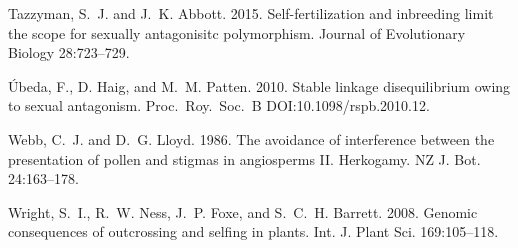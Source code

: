 \documentclass{article}
\begin{document}
\begin{thebibliography}{}
Tazzyman, S.~J. and J.~K. Abbott. 2015.
\newblock Self-fertilization and inbreeding limit the scope for sexually antagonisitc polymorphism.
\newblock Journal of Evolutionary Biology 28:723--729.

\'Ubeda, F., D. Haig, and M.~M. Patten. 2010.
\newblock Stable linkage disequilibrium owing to sexual antagonism.
\newblock Proc.~Roy.~Soc.~B DOI:10.1098/rspb.2010.12.

Webb, C.~J. and D.~G. Lloyd. 1986.
\newblock The avoidance of interference between the presentation of pollen and stigmas in angiosperms II. Herkogamy.
\newblock NZ J. Bot. 24:163--178.

Wright, S.~I., R.~W. Ness, J.~P. Foxe, and S.~C.~H. Barrett. 2008.
\newblock Genomic consequences of outcrossing and selfing in plants.
\newblock Int. J. Plant Sci. 169:105--118.


\end{thebibliography}
\end{document}
